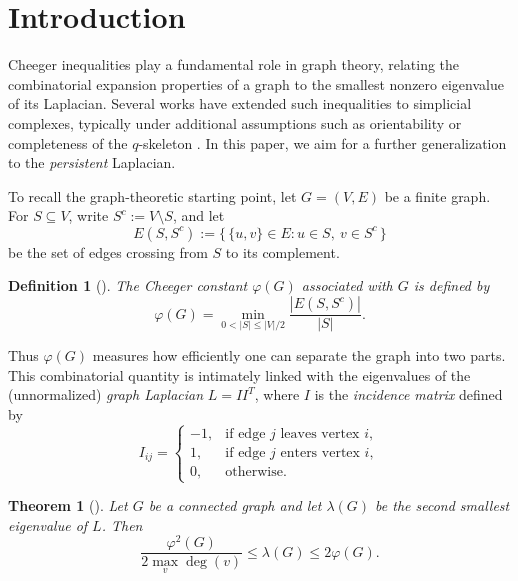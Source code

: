 \documentclass{article}
\newtheorem{theorem}{Theorem}[section]
\newtheorem{definition}{Definition}[section]
\begin{document}
\section{Introduction}\label{sec:introduction}

Cheeger inequalities play a fundamental role in graph theory, relating the combinatorial expansion properties of a graph to the smallest nonzero eigenvalue of its Laplacian. Several works have extended such inequalities to simplicial complexes, typically under additional assumptions such as orientability or completeness of the \(q\)-skeleton \cite{jost2024cheeger,MR3382297,MR3516884,MR3194207}. In this paper, we aim for a further generalization to the \emph{persistent} Laplacian.

To recall the graph-theoretic starting point, let \(G=(V,E)\) be a finite graph. For \(S\subseteq V\), write \(S^c:=V\setminus S\), and let
\[
E(S,S^c):=\{\,\{u,v\}\in E : u\in S,\ v\in S^c\,\}
\]
be the set of edges crossing from \(S\) to its complement.

\begin{definition}[{\cite[Section 2.5]{MR1421568}}]\label{def:graph_asymm_cheeger}
The Cheeger constant \(\varphi(G)\) associated with \(G\) is defined by
\begin{equation}\label{eq:graph_asymm_cheeger}
\varphi(G)=\min_{0<|S|\leq |V|/2}\frac{|E(S,S^c)|}{|S|}.
\end{equation}
\end{definition}

Thus \(\varphi(G)\) measures how efficiently one can separate the graph into two parts. This combinatorial quantity is intimately linked with the eigenvalues of the (unnormalized) \emph{graph Laplacian} \(L=II^T\), where \(I\) is the \emph{incidence matrix} defined by
\[
I_{ij}=
\begin{cases}
-1, & \text{if edge } j \text{ leaves vertex } i,\\
1, & \text{if edge } j \text{ enters vertex } i,\\
0, & \text{otherwise}.
\end{cases}
\]
\begin{theorem}[{\cite[Section 2.5]{MR1421568}}]
Let $G$ be a connected graph and let \(\lambda(G)\) be the second smallest eigenvalue of \(L\). Then
\begin{equation}\label{eq:graph_symm_cheeger_ineq}
\frac{\varphi^2(G)}{2\max\limits_v \deg(v)}\leq \lambda(G) \leq 2\varphi(G).
\end{equation}
\end{theorem}
\end{document}
